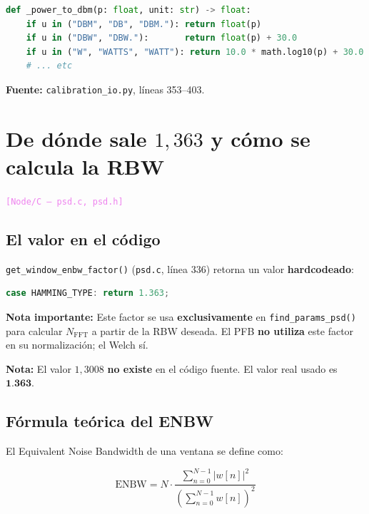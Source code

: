 \documentclass[11pt,a4paper]{article}
\newcommand{\where}[1]{\textcolor{violet}{\texttt{[#1]}}}
\begin{document}
\begin{lstlisting}[language=Python]
def _power_to_dbm(p: float, unit: str) -> float:
    if u in ("DBM", "DB", "DBM."): return float(p)
    if u in ("DBW", "DBW."):       return float(p) + 30.0
    if u in ("W", "WATTS", "WATT"): return 10.0 * math.log10(p) + 30.0
    # ... etc
\end{lstlisting}

\textbf{Fuente:} \texttt{calibration\_io.py}, líneas 353--403.

\section{De dónde sale \texorpdfstring{$1{,}363$}{1.363} y cómo se calcula la RBW}
\label{sec:enbw}

\where{Node/C — \texttt{psd.c}, \texttt{psd.h}}

\subsection{El valor en el código}

\texttt{get\_window\_enbw\_factor()} (\texttt{psd.c}, línea 336) retorna un valor \textbf{hardcodeado}:

\begin{lstlisting}[language=C]
case HAMMING_TYPE: return 1.363;
\end{lstlisting}

\textbf{Nota importante:} Este factor se usa \textbf{exclusivamente} en \texttt{find\_params\_psd()} para calcular $N_{\text{FFT}}$ a partir de la RBW deseada. El PFB \textbf{no utiliza} este factor en su normalización; el Welch sí.

\textbf{Nota:} El valor $1{,}3008$ \textbf{no existe} en el código fuente. El valor real usado es $\textbf{1.363}$.

\subsection{Fórmula teórica del ENBW}

El Equivalent Noise Bandwidth de una ventana se define como:

\begin{equation}
\text{ENBW} = N \cdot \frac{\displaystyle\sum_{n=0}^{N-1} |w[n]|^2}{\left(\displaystyle\sum_{n=0}^{N-1} w[n]\right)^2}
\label{eq:enbw_def}
\end{equation}
\end{document}
